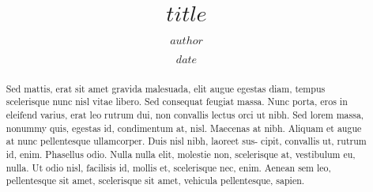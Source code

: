 \documentclass[a4paper,10.5pt]{amsart}
\begin{document}
	\title{$title$}
	\author{$author$}
	\date{$date$}
	\begin{abstract}
		Sed mattis, erat sit amet gravida malesuada, elit augue egestas diam, tempus scelerisque nunc nisl vitae libero. Sed consequat feugiat massa. Nunc porta, eros in eleifend varius, erat leo rutrum dui, non convallis lectus orci ut nibh. Sed lorem massa, nonummy quis, egestas id, condimentum at, nisl. Maecenas at nibh. Aliquam et augue at nunc pellentesque ullamcorper. Duis nisl nibh, laoreet sus- cipit, convallis ut, rutrum id, enim. Phasellus odio. Nulla nulla elit, molestie non, scelerisque at, vestibulum eu, nulla. Ut odio nisl, facilisis id, mollis et, scelerisque nec, enim. Aenean sem leo, pellentesque sit amet, scelerisque sit amet, vehicula pellentesque, sapien.
	\end{abstract}

	\maketitle
	
	
	
\end{document}
